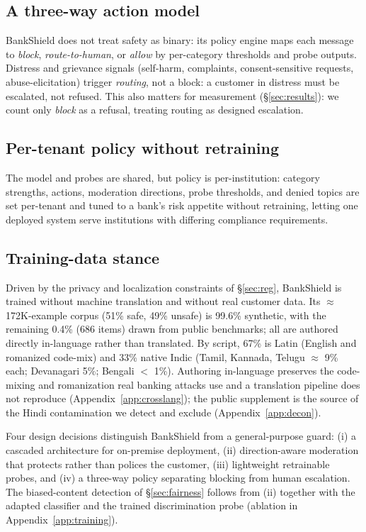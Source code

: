 \documentclass[11pt]{article}
\begin{document}
\subsection{A three-way action model}
\label{sec:threeway}

BankShield does not treat safety as binary: its policy engine maps each message to \emph{block}, \emph{route-to-human}, or \emph{allow} by per-category thresholds and probe outputs. Distress and grievance signals (self-harm, complaints, consent-sensitive requests, abuse-elicitation) trigger \emph{routing}, not a block: a customer in distress must be escalated, not refused. This also matters for measurement (\S\ref{sec:results}): we count only \emph{block} as a refusal, treating routing as designed escalation.

\subsection{Per-tenant policy without retraining}
\label{sec:tenant}

The model and probes are shared, but policy is per-institution: category strengths, actions, moderation directions, probe thresholds, and denied topics are set per-tenant and tuned to a bank's risk appetite without retraining, letting one deployed system serve institutions with differing compliance requirements.

\subsection{Training-data stance}
\label{sec:data}

Driven by the privacy and localization constraints of \S\ref{sec:reg}, BankShield is trained without machine translation and without real customer data. Its $\approx$172K-example corpus (51\% safe, 49\% unsafe) is 99.6\% synthetic, with the remaining 0.4\% (686 items) drawn from public benchmarks; all are authored directly in-language rather than translated. By script, 67\% is Latin (English and romanized code-mix) and 33\% native Indic (Tamil, Kannada, Telugu $\approx$ 9\% each; Devanagari 5\%; Bengali $<$ 1\%). Authoring in-language preserves the code-mixing and romanization real banking attacks use and a translation pipeline does not reproduce (Appendix~\ref{app:crosslang}); the public supplement is the source of the Hindi contamination we detect and exclude (Appendix~\ref{app:decon}).

Four design decisions distinguish BankShield from a general-purpose guard: (i) a cascaded architecture for on-premise deployment, (ii) direction-aware moderation that protects rather than polices the customer, (iii) lightweight retrainable probes, and (iv) a three-way policy separating blocking from human escalation. The biased-content detection of \S\ref{sec:fairness} follows from (ii) together with the adapted classifier and the trained discrimination probe (ablation in Appendix~\ref{app:training}).
\end{document}
